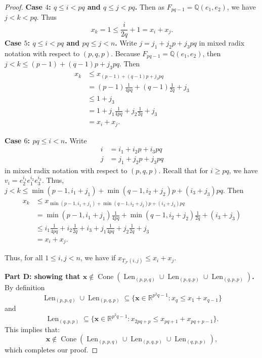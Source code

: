 \documentclass[letterpaper,10pt]{amsart}
\DeclareMathOperator{\Len}{Len}
\DeclareMathOperator{\Cone}{Cone}
\newcommand{\QQ}{\mathbb{Q}}      %
\newcommand{\RR}{\mathbb{R}}      %
\newcommand{\cF}{\mathcal{F}}
\theoremstyle{definition}
\theoremstyle{remark}
\begin{document}
\begin{proof}
\noindent \textbf{Case $4$: $q \leq i < pq$ and $q \leq j < pq$.}
Then as $F_{pq-1} = \QQ( e_1,e_2 )$, we have $j < k < pq$. Thus
\[
	x_k = 1 \leq \frac{i}{2q} + 1 = x_i + x_j.
\]
\noindent \textbf{Case $5$: $q \leq i < pq$ and $pq \leq j < n$.}
Write $j = j_1 + j_2p + j_3pq$ in mixed radix notation with respect to $(p,q,p)$. Because $F_{pq-1} = \QQ( e_1,e_2)$, then $j < k \leq (p-1) + (q-1)p + j_3pq$. Then
\begin{align*}
x_k &\leq x_{(p-1) + (q-1)p + j_3pq} \\
& = (p-1) \frac{1}{4pq} + (q-1) \frac{1}{2q} + j_3 \\
& \leq 1 + j_3 \\
&= 1 + j_1 \frac{1}{4pq} + j_2 \frac{1}{2q} + j_3  \\
&= x_i + x_j.
\end{align*}

\noindent \textbf{Case $6$: $pq \leq i < n$.}
Write
\begin{align*}
i &= i_1 + i_2p + i_3pq \\
j &= j_1 + j_2p + j_3pq
\end{align*}
in mixed radix notation with respect to $(p,q,p)$. Recall that for $i \geq pq$, we have $v_i = e_2^{i_1}e_1^{i_2}e_3^{i_3}$. Thus, $j < k \leq \min(p-1,i_1+j_1) + \min(q-1,i_2+j_2)p + (i_3 + j_3)pq$.  Then
\begin{align*}
x_k &\leq x_{\min(p-1,i_1+j_1) + \min(q-1,i_2+j_2)p + (i_3 + j_3)pq} \\
& = \min(p-1,i_1+j_1) \frac{1}{4pq} + \min(q-1,i_2+j_2)\frac{1}{2q} + (i_3 + j_3) \\
&\leq i_1 \frac{1}{4pq} + i_2 \frac{1}{2q} + i_3 + j_1 \frac{1}{4pq} + j_2 \frac{1}{2q} + j_3 \\
&=x_i + x_j.
\end{align*}

Thus, for all $1 \leq i,j < n$, we have if $x_{T_{\cF}(i,j)} \leq x_i + x_j$. 

\noindent \textbf{Part D: showing that $\mathbf{x} \notin \Cone(\Len_{(p,p,q)} \cup \Len_{(p,q,p)} \cup \Len_{(q,p,p)})$.} 
By definition 
\[
	\Len_{(p,p,q)} \cup \Len_{(p,q,p)} \subseteq \{\mathbf{x} \in \RR^{p^2q-1} : x_{q} \leq x_1 + x_{q-1} \}
\]
and
\[
	\Len_{(q,p,p)} \subseteq \{\mathbf{x} \in \RR^{p^2q-1} : x_{2pq+p} \leq x_{pq+1} + x_{pq + p - 1}\}.
\]
This implies that: 
\[
	\mathbf{x} \notin \Cone(\Len_{(p,p,q)} \cup \Len_{(p,q,p)} \cup \Len_{(q,p,p)}),
\]
which completes our proof.
\end{proof}
\end{document}
